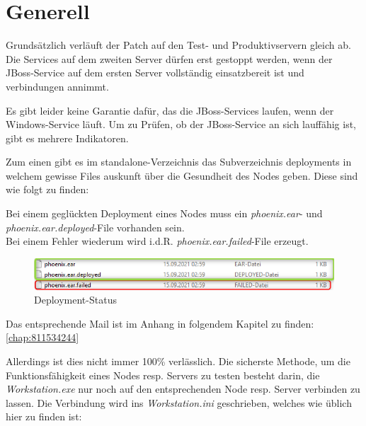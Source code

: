 
\chapter{Generell}
\begin{flushleft}
    Grundsätzlich verläuft der Patch auf den Test- und Produktivservern gleich ab.
    Die Services auf dem zweiten Server dürfen erst gestoppt werden, wenn der \Gls{JBoss}-Service auf dem ersten Server vollständig einsatzbereit ist und
    verbindungen annimmt.
\end{flushleft}
\begin{flushleft}
    Es gibt leider keine Garantie dafür, das die \Gls{JBoss}-Services laufen, wenn der Windows-Service läuft.
    Um zu Prüfen, ob der \Gls{JBoss}-Service an sich lauffähig ist, gibt es mehrere Indikatoren.
\end{flushleft}
\begin{flushleft}
    Zum einen gibt es im standalone-Verzeichnis das Subverzeichnis deployments in welchem gewisse Files auskunft über die Gesundheit des Nodes geben.
    Diese sind wie folgt zu finden:
\end{flushleft}
\begin{flushleft}
    Bei einem geglückten Deployment eines Nodes muss ein \textit{phoenix.ear}- und \textit{phoenix.ear.deployed}-File vorhanden sein.\\Bei einem Fehler wiederum wird i.d.R. \textit{phoenix.ear.failed}-File erzeugt.
    \begin{figure}[H]
        \centering
        \includegraphics[width=1\linewidth]{source/general/deployments}
        \caption{Deployment-Status}
        \label{fig:deployment-status}
    \end{figure}
    Das entsprechende Mail ist im Anhang in folgendem Kapitel zu finden: \autoref{chap:811534244}
\end{flushleft}
\begin{flushleft}
    Allerdings ist dies nicht immer 100\% verlässlich.
    Die sicherste Methode, um die Funktionsfähigkeit eines Nodes resp.
    Servers zu testen besteht darin, die \textit{Workstation.exe} nur noch auf den entsprechenden Node resp.
    Server verbinden zu lassen.
    Die Verbindung wird ins \textit{Workstation.ini} geschrieben, welches wie üblich hier zu finden ist:
\end{flushleft}
